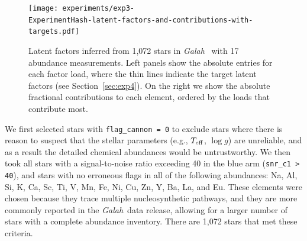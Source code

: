 \documentclass[twocolumn]{aastex62}
\newcommand\teff{T_{\rm eff}}
\newcommand\logg{\log{g}}
\newcommand{\project}[1]{\textsl{#1}}
\newcommand{\Galah}{\project{Galah}}
\newcommand{\todo}[1]{\textcolor{red}{#1}}
\newcommand{\ExperimentHash}{89dab}
\begin{document}
\begin{figure}
	\texttt{[image: experiments/exp3-\\ExperimentHash-latent-factors-and-contributions-with-targets.pdf]}
	\caption{Latent factors inferred from 1,072 stars in \Galah\
			 \citep[][thick lines]{Buder:2018} with 17 abundance measurements. Left panels show the absolute entries for each
			 factor load, where the thin lines indicate the target latent factors (see Section~\ref{sec:exp4}). On the right we show the absolute fractional contributions
			 to each element, ordered by the loads that contribute most.}
    \label{fig:exp3-factor-loads}
\end{figure}



We first selected stars with \texttt{flag\_cannon = 0} to exclude
stars where there is reason to suspect that the stellar parameters
(e.g., $\teff$, $\logg$) are unreliable, and as a result the 
detailed chemical abundances would be untrustworthy. We then took all
stars with a signal-to-noise ratio exceeding 40 in the blue arm (\texttt{snr\_c1 > 40}), and
stars with no erroneous flags in all of the following abundances: Na, Al, Si, K, Ca, Sc, Ti, V, Mn, Fe, Ni, Cu, Zn, Y, Ba, La, and Eu.
These elements were chosen because they trace multiple nucleosynthetic pathways, and they are more commonly reported in the \Galah\ data release, allowing for a larger number of stars with a complete abundance inventory.
There are 1,072 stars that met these criteria. 

\end{document}
